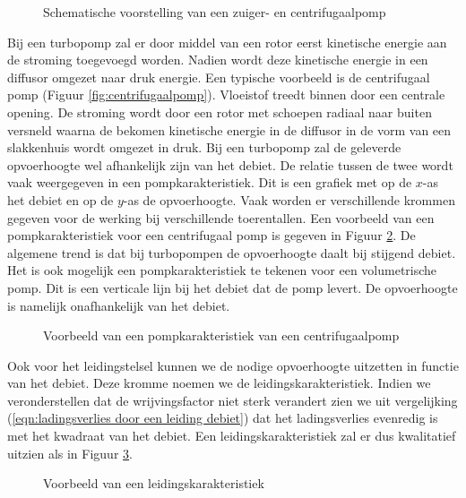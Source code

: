 \begin{figure}
	\centering
	\subfigure[Zuigerpomp]{
		
		\label{fig:zuigerpomp}
	} \quad
	\subfigure[Centrifugaalpomp]{
		
		\label{fig:centrifugaalpomp}
	}	
	\caption{Schematische voorstelling van een zuiger- en centrifugaalpomp}
	\label{fig:pompen}
\end{figure}
\npar
Bij een turbopomp zal er door middel van een rotor eerst kinetische energie aan de stroming toegevoegd worden. Nadien wordt deze kinetische energie in een diffusor omgezet naar druk energie. Een typische voorbeeld is de centrifugaal pomp (Figuur \ref{fig:centrifugaalpomp}). Vloeistof treedt binnen door een centrale opening. De stroming wordt door een rotor met schoepen radiaal naar buiten versneld waarna de bekomen kinetische energie in de diffusor in de vorm van een slakkenhuis wordt omgezet in druk.
\npar
Bij een turbopomp zal de geleverde opvoerhoogte wel afhankelijk zijn van het debiet. De relatie tussen de twee wordt vaak weergegeven in een pompkarakteristiek. Dit is een grafiek met op de $x$-as het debiet en op de $y$-as de opvoerhoogte. Vaak worden er verschillende krommen gegeven voor de werking bij verschillende toerentallen. Een voorbeeld van een pompkarakteristiek voor een centrifugaal pomp is gegeven in Figuur \ref{fig:Pompkarakteristiek}. De algemene trend is dat bij turbopompen de opvoerhoogte daalt bij stijgend debiet. Het is ook mogelijk een pompkarakteristiek te tekenen voor een volumetrische pomp. Dit is een verticale lijn bij het debiet dat de pomp levert. De opvoerhoogte is namelijk onafhankelijk van het debiet.
\begin{figure}
	\centering
	
	\caption{Voorbeeld van een pompkarakteristiek van een centrifugaalpomp}
	\label{fig:Pompkarakteristiek}
\end{figure}
\npar
Ook voor het leidingstelsel kunnen we de nodige opvoerhoogte uitzetten in functie van het debiet. Deze kromme noemen we de leidingskarakteristiek. Indien we veronderstellen dat de wrijvingsfactor niet sterk verandert zien we uit vergelijking (\ref{eqn:ladingsverlies door een leiding debiet}) dat het ladingsverlies evenredig is met het kwadraat van het debiet. Een leidingskarakteristiek zal er dus kwalitatief uitzien als in Figuur \ref{fig:Leidingskarakteristiek}.
\begin{figure}
	\centering
	
	\caption{Voorbeeld van een leidingskarakteristiek}
	\label{fig:Leidingskarakteristiek}
\end{figure}

